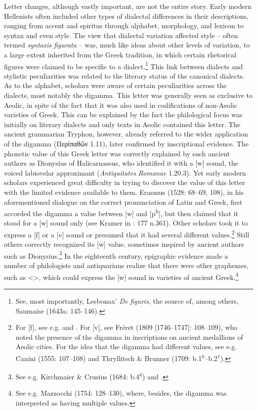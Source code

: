 Letter changes, although vastly important, are not the entire story. Early modern Hellenists often included other types of dialectal differences in their descriptions, ranging from accent and spiritus through alphabet, morphology, and lexicon to syntax and even style. The view that dialectal variation affected style – often termed \textit{syntaxis} \textit{figurata} – was, much like ideas about other levels of variation, to a large extent inherited from the Greek tradition, in which certain rhetorical figures were claimed to be specific to a dialect.\footnote{ \textrm{See, most importantly, Lesbonax’} \textrm{\textit{De} \textit{figuris}}\textrm{, the source of, among others, Saumaise (1643a: 145–146).}} This link between dialects and stylistic peculiarities was related to the literary status of the canonical dialects. As to the alphabet, scholars were aware of certain peculiarities across the dialects, most notably the digamma. This letter was generally seen as exclusive to Aeolic, in spite of the fact that it was also used in codifications of non-Aeolic varieties of Greek. This can be explained by the fact the philological focus was initially on literary dialects and only texts in Aeolic contained this letter. The ancient grammarian Tryphon, however, already referred to the wider application of the digamma (Περὶπαθῶν 1.11), later confirmed by inscriptional evidence. The phonetic value of this Greek letter was correctly explained by such ancient authors as Dionysius of Halicarnassus, who identified it with a [w] sound, the voiced labiovelar approximant (\textit{Antiquitates} \textit{Romanae} 1.20.3). Yet early modern scholars experienced great difficulty in trying to discover the value of this letter with the limited evidence available to them. Erasmus (1528: 68–69, 108), in his aforementioned dialogue on the correct pronunciation of Latin and Greek, first accorded the digamma a value between [w] and [p\textsuperscript{h}], but then claimed that it stood for a [w] sound only (see Kramer in \citealt{Erasmus1978}: 177 n.361). Other scholars took it to express a [f] or a [v] sound or presumed that it had several different values.\footnote{ \textrm{For [f], see e.g. \citet[4]{Sylvius1531} and \citet[5]{Rhenius1626}. For [v], see Fréret (1809 [1746–1747]: 108–109), who noted the presence of the digamma in inscriptions on ancient medallions of Aeolic cities. For the idea that the digamma had different values, see e.g. Canini (1555: 107–108) and Thryllitsch \& Brunner (1709: b.1}\textrm{\textsc{\textsuperscript{r}}}\textrm{–b.2}\textrm{\textsc{\textsuperscript{v}}}).} Still others correctly recognized its [w] value, sometimes inspired by ancient authors such as Dionysius.\footnote{ \textrm{See e.g. Kirchmaier \& Crusius (1684: b.4}\textrm{\textsc{\textsuperscript{r}}}\textrm{) }\textrm{and \citet[19]{Reynolds1752}.}} In the eighteenth century, epigraphic evidence made a number of philologists and antiquarians realize that there were other graphemes, such as <{\sqsubset}>, which could express the [w] sound in varieties of ancient Greek.\footnote{ \textrm{See e.g. Mazzocchi (1754: 128–130), where, besides, the digamma was interpreted as having multiple values.}}


